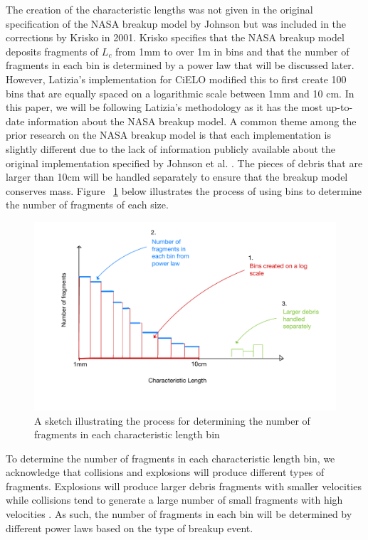 \documentclass[a4paper, 12pt]{article}
\begin{document}
The creation of the characteristic lengths was not given in the original specification of the NASA breakup model by Johnson \citep{johnson_nasas_2001} but was included in the corrections by Krisko in 2001. Krisko specifies that the NASA breakup model deposits fragments of $L_c$ from 1mm to over 1m in bins and that the number of fragments in each bin is determined by a power law that will be discussed later. However, Latizia's implementation for CiELO modified this to first create 100 bins that are equally spaced on a logarithmic scale between 1mm and 10 cm. In this paper, we will be following Latizia's methodology as it has the most up-to-date information about the NASA breakup model. A common theme among the prior research on the NASA breakup model is that each implementation is slightly different due to the lack of information publicly available about the original implementation specified by Johnson et al. \cite{johnson_nasas_2001}. The pieces of debris that are larger than 10cm will be handled separately to ensure that the breakup model conserves mass. Figure ~\ref{bins_sketch} below illustrates the process of using bins to determine the number of fragments of each size.

\begin{figure}[H]
	\centering
	\includegraphics[scale=0.6]{L_c_sketch}
	\caption{A sketch illustrating the process for determining the number of fragments in each characteristic length bin}
	\label{bins_sketch}
\end{figure}

To determine the number of fragments in each characteristic length bin, we acknowledge that collisions and explosions will produce different types of fragments. Explosions will produce larger debris fragments with smaller velocities while collisions tend to generate a large number of small fragments with high velocities \citep{barrows_evolution_1996}.  As such, the number of fragments in each bin will be determined by different power laws based on the type of breakup event.
 
\end{document}
